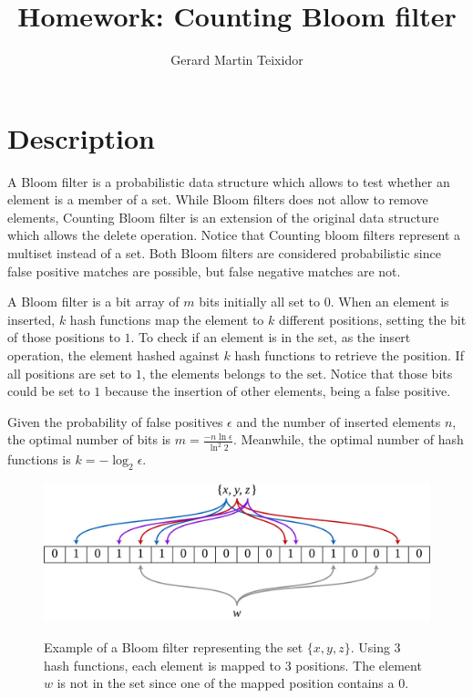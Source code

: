 \documentclass{article}
\title{Homework: Counting Bloom filter}
\author{Gerard Martin Teixidor}
\begin{document}
\maketitle

\section*{Description}
A Bloom filter\cite{bloom} is a probabilistic data structure which allows to test whether an element is a member of a set. While Bloom filters does not allow to remove elements, Counting Bloom filter\cite{counting} is an extension of the original data structure which allows the delete operation. Notice that Counting bloom filters represent a multiset instead of a set. Both Bloom filters are considered probabilistic since false positive matches are possible, but false negative matches are not.

A Bloom filter is a bit array of $m$ bits initially all set to $0$. When an element is inserted, $k$ hash functions map the element to $k$ different positions, setting the bit of those positions to $1$. To check if an element is in the set, as the insert operation, the element hashed against $k$ hash functions to retrieve the position. If all positions are set to $1$, the elements belongs to the set. Notice that those bits could be set to $1$ because the insertion of other elements, being a false positive.

Given the probability of false positives $\epsilon$ and the number of inserted elements $n$, the optimal number of bits is $m = \frac{-n\ln\epsilon}{\ln^2 2}$. Meanwhile, the optimal number of hash functions is $k=-\log_2\epsilon$.

\begin{figure}[h]
\centering
\includegraphics[width=0.8\linewidth]{bloom_filter.png}
\label{fig:bloom_filter}
\caption{Example of a Bloom filter representing the set $\{x, y ,z\}$. Using $3$ hash functions, each element is mapped to $3$ positions. The element $w$ is not in the set since one of the mapped position contains a $0$.}
\end{figure}
\end{document}
